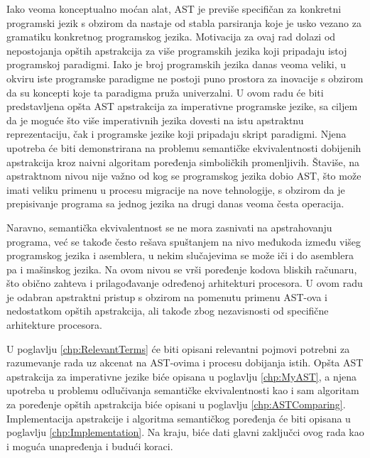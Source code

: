 Iako veoma konceptualno moćan alat, AST je previše specifičan za konkretni programski jezik s obzirom da nastaje od stabla parsiranja koje je usko vezano za gramatiku konkretnog programskog jezika. Motivacija za ovaj rad dolazi od nepostojanja opštih apstrakcija za više programskih jezika koji pripadaju istoj programskoj paradigmi. Iako je broj programskih jezika danas veoma veliki, u okviru iste programske paradigme ne postoji puno prostora za inovacije s obzirom da su koncepti koje ta paradigma pruža univerzalni. U ovom radu će biti predstavljena opšta AST apstrakcija za imperativne programske jezike, sa ciljem da je moguće što više imperativnih jezika dovesti na istu apstraktnu reprezentaciju, čak i programske jezike koji pripadaju skript paradigmi. Njena upotreba će biti demonstrirana na problemu semantičke ekvivalentnosti dobijenih apstrakcija kroz naivni algoritam poređenja simboličkih promenljivih. Štaviše, na apstraktnom nivou nije važno od kog se programskog jezika dobio AST, što može imati veliku primenu u procesu migracije na nove tehnologije, s obzirom da je prepisivanje programa sa jednog jezika na drugi danas veoma česta operacija.

Naravno, semantička ekvivalentnost se ne mora zasnivati na apstrahovanju programa, već se takođe često rešava spuštanjem na nivo međukoda između višeg programskog jezika i asemblera, u nekim slučajevima se može iči i do asemblera pa i mašinskog jezika. Na ovom nivou se vrši poređenje kodova bliskih računaru, što obično zahteva i prilagođavanje određenoj arhitekturi procesora. U ovom radu je odabran apstraktni pristup s obzirom na pomenutu primenu AST-ova i nedostatkom opštih apstrakcija, ali takođe zbog nezavisnosti od specifične arhitekture procesora. 

U poglavlju \ref{chp:RelevantTerms} će biti opisani relevantni pojmovi potrebni za razumevanje rada uz akcenat na AST-ovima i procesu dobijanja istih. Opšta AST apstrakcija za imperativne jezike biće opisana u poglavlju \ref{chp:MyAST}, a njena upotreba u problemu odlučivanja semantičke ekvivalentnosti kao i sam algoritam za poređenje opštih apstrakcija biće opisani u poglavlju \ref{chp:ASTComparing}. Implementacija apstrakcije i algoritma semantičkog poređenja će biti opisana u poglavlju \ref{chp:Implementation}. Na kraju, biće dati glavni zaključci ovog rada kao i moguća unapređenja i budući koraci. 

